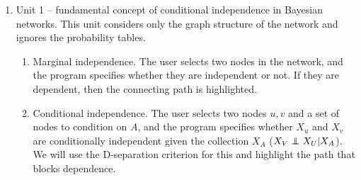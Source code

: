 \documentclass{article}
\newcommand{\comment}[2]{
	\todo[color=GreenYellow,inline]{
		\underline{\textbf{#1:}} #2
	}}
\newcommand\independent{\protect\mathpalette{\protect\independenT}{\perp}}
\def\independenT#1#2{\mathrel{\rlap{$#1#2$}\mkern2mu{#1#2}}}
\begin{document}
    \begin{enumerate}
        \item Unit 1\label{unit1} -- 
       fundamental concept of conditional independence in Bayesian networks. This unit considers only the graph structure of the network and ignores the probability tables.
        \begin{enumerate}
            \item Marginal independence. The user selects two nodes in the network, and the program specifies whether they are independent or not. If they are dependent, then the connecting path is highlighted.
            \item Conditional independence. The user selects two nodes $u,v$ and a set of nodes to condition on $A$, and the program specifies whether $X_u$ and $X_v$ are conditionally independent given the collection $X_A$ ($X_V \independent X_U | X_A$). We will use the D-separation criterion for this and highlight the path that blocks dependence.
            
        \end{enumerate}


\end{enumerate}
\end{document}
